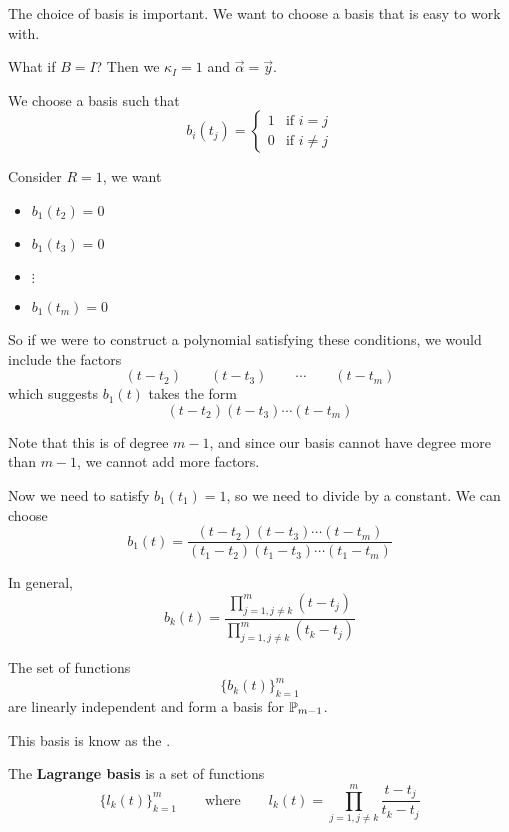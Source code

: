 \begin{remark}
    The choice of basis is important. We want to choose a basis that is easy to work with.
\end{remark}

What if \( B = I \)? Then we \( \kappa_I = 1 \) and \( \vec{\alpha} = \vec{y} \).

We choose a basis such that \[
    b_i(t_j) = \begin{cases}
        1 & \text{if } i = j    \\
        0 & \text{if } i \neq j
    \end{cases}
\]

\begin{example}
    Consider \( R = 1 \), we want
    \begin{itemize}
        \item \( b_1 (t_2) = 0 \)
        \item \( b_1 (t_3) = 0 \)
        \item \( \vdots \)
        \item \( b_1 (t_m) = 0 \)
    \end{itemize}

    So if we were to construct a polynomial satisfying these conditions, we would include the factors \[
        (t - t_2) \qquad (t - t_3) \qquad \cdots \qquad (t - t_m)
    \] which suggests \( b_1(t) \) takes the form \[
        (t - t_2)(t - t_3) \cdots (t - t_m)
    \]

    Note that this is of degree \( m-1 \), and since our basis cannot have degree more than \( m-1 \), we cannot add more factors.

    Now we need to satisfy \( b_1(t_1) = 1 \), so we need to divide by a constant. We can choose \[
        b_1(t) = \frac{(t - t_2)(t - t_3) \cdots (t - t_m)}{(t_1 - t_2)(t_1 - t_3) \cdots (t_1 - t_m)}
    \]
\end{example}

In general, \[
    b_k(t) = \frac{\displaystyle\prod_{j=1, j \neq k}^{m} (t - t_j)}{\displaystyle\prod_{j=1, j \neq k}^{m} (t_k - t_j)}
\]

\begin{lemma}
    The set of functions \[
        \{ {b_k}(t) \}_{k=1}^{m}
    \] are linearly independent and form a basis for \( \P_{m-1} \).
\end{lemma}

This basis is know as the .

\begin{definition}
    The \textbf{Lagrange basis} is a set of functions \[
        \{ l_k(t) \}_{k=1}^{m} \qquad \text{where} \qquad l_k(t) =
        \prod_{j=1, j \neq k}^{m} \frac{t - t_j}{t_k - t_j}
    \]
\end{definition}

